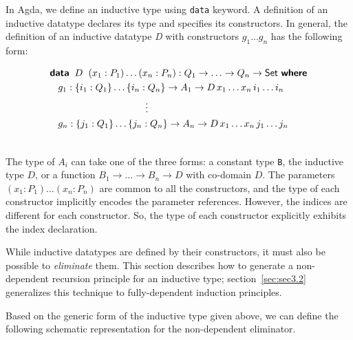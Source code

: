 \documentclass[sigplan,10pt]{acmart}
\begin{document}
In Agda, we define an inductive type using {\tt data} keyword. A definition of an inductive datatype declares its type and specifies its constructors.
In general, the definition of an inductive datatype \emph{D} with constructors $g_1 \ldots g_n$ has the following form:
\begin{center}
\begingroup
\fontsize{7.9pt}{0pt}\selectfont
\begin{align}
& \KW{data}  \hspace{0.2cm} D \hspace{0.2cm} (x_1:P_1)\ldots(x_n:P_n) : Q_1 \rightarrow\ldots\rightarrow Q_n \rightarrow \SET{} \, \, \KW{where} \nonumber \\
& \hspace{0.3cm} g_1 : \{i_1 : Q_1\} \ldots \{i_n : Q_n\} \rightarrow A_1\rightarrow D \, x_1 \ldots x_n \, i_1 \ldots i_n \nonumber \\
& \hspace{3.5cm} \vdots \nonumber \\
& \hspace{0.3cm} g_n : \{j_1 : Q_1\} \ldots \{j_n : Q_n\} \rightarrow A_n\rightarrow D \, x_1 \dots x_n \, j_1 \ldots j_n \nonumber \\ \nonumber
\end{align}
\endgroup
\end{center}
\normalsize

The type of $A_i$ can take one of the three forms: a constant type {\tt B}, the inductive type $D$, or a function $B_1 \rightarrow \ldots \rightarrow B_n \rightarrow D$ with co-domain $D$. The parameters $(x_1:P_1)\ldots(x_n:P_n)$ are common to all the constructors, and the type of each constructor implicitly encodes the parameter references. However, the indices are different for each constructor. So, the type of each constructor explicitly exhibits the index declaration.

While inductive datatypes are defined by their constructors, it must also be possible to \emph{eliminate} them. This section describes how to generate a non-dependent recursion principle for an inductive type; section~\ref{sec:sec3.2} generalizes this technique to fully-dependent induction principles.

Based on the generic form of the inductive type given above, we can define the following schematic representation for the non-dependent eliminator.
\end{document}
